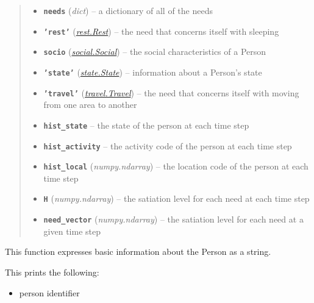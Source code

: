 \documentclass[letterpaper,10pt,english]{sphinxmanual}
\begin{document}
\begin{fulllineitems}
\begin{quote}
\begin{description}
\begin{itemize}
\item {} 
\textbf{\texttt{needs}} (\emph{dict}) -- a dictionary of all of the  needs

\item {} 
\textbf{\texttt{'rest'}} ({\hyperref[rest:rest.Rest]{\emph{\emph{rest.Rest}}}}) -- the need that concerns itself with sleeping

\item {} 
\textbf{\texttt{socio}} ({\hyperref[social:social.Social]{\emph{\emph{social.Social}}}}) -- the social characteristics of a Person

\item {} 
\textbf{\texttt{'state'}} ({\hyperref[state:state.State]{\emph{\emph{state.State}}}}) -- information about a Person's state

\item {} 
\textbf{\texttt{'travel'}} ({\hyperref[travel:travel.Travel]{\emph{\emph{travel.Travel}}}}) -- the need that concerns itself with moving from one area to another

\item {} 
\textbf{\texttt{hist\_state}} -- the state of the person at each time step

\item {} 
\textbf{\texttt{hist\_activity}} -- the activity code of the person at each time step

\item {} 
\textbf{\texttt{hist\_local}} (\emph{numpy.ndarray}) -- the location code of the person at each time step

\item {} 
\textbf{\texttt{H}} (\emph{numpy.ndarray}) -- the satiation level for each need at each time step

\item {} 
\textbf{\texttt{need\_vector}} (\emph{numpy.ndarray}) -- the satiation level for each need at a given time step

\end{itemize}

\end{description}\end{quote}

\begin{fulllineitems}
\label{person:person.Person.print_basic_info}
This function expresses basic information about the Person as a string.

This prints the following:
\begin{itemize}
\item {} 
person identifier


\end{itemize}
\end{fulllineitems}
\end{fulllineitems}
\end{document}
